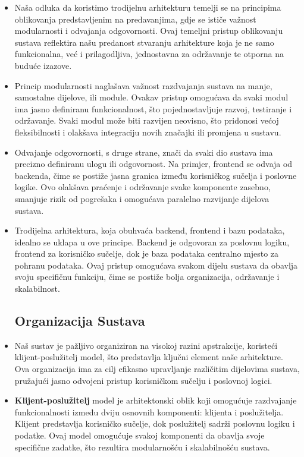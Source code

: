 \begin{itemize}
    \item Naša odluka da koristimo trodijelnu arhitekturu temelji se na principima oblikovanja predstavljenim na predavanjima, gdje se ističe važnost modularnosti i odvajanja odgovornosti. Ovaj temeljni pristup oblikovanju sustava reflektira našu predanost stvaranju arhitekture koja je ne samo funkcionalna, već i prilagodljiva, jednostavna za održavanje te otporna na buduće izazove. 

    \item Princip modularnosti naglašava važnost razdvajanja sustava na manje, samostalne dijelove, ili module. Ovakav pristup omogućava da svaki modul ima jasno definiranu funkcionalnost, što pojednostavljuje razvoj, testiranje i održavanje. Svaki modul može biti razvijen neovisno, što pridonosi većoj fleksibilnosti i olakšava integraciju novih značajki ili promjena u sustavu. 

    \item Odvajanje odgovornosti, s druge strane, znači da svaki dio sustava ima precizno definiranu ulogu ili odgovornost. Na primjer, frontend se odvaja od backenda, čime se postiže jasna granica između korisničkog sučelja i poslovne logike. Ovo olakšava praćenje i održavanje svake komponente zasebno, smanjuje rizik od pogrešaka i omogućava paralelno razvijanje dijelova sustava. 

\item Trodijelna arhitektura, koja obuhvaća backend, frontend i bazu podataka, idealno se uklapa u ove principe. Backend je odgovoran za poslovnu logiku, frontend za korisničko sučelje, dok je baza podataka centralno mjesto za pohranu podataka. Ovaj pristup omogućava svakom dijelu sustava da obavlja svoju specifičnu funkciju, čime se postiže bolja organizacija, održavanje i skalabilnost. 

\subsection*{Organizacija Sustava}
\item Naš sustav je pažljivo organiziran na visokoj razini apstrakcije, koristeći klijent-poslužitelj model, što predstavlja ključni element naše arhitekture. Ova organizacija ima za cilj efikasno upravljanje različitim dijelovima sustava, pružajući jasno odvojeni pristup korisničkom sučelju i poslovnoj logici. 

\item \textbf{Klijent-poslužitelj} model je arhitektonski oblik koji omogućuje razdvajanje funkcionalnosti između dviju osnovnih komponenti: klijenta i poslužitelja. Klijent predstavlja korisničko sučelje, dok poslužitelj sadrži poslovnu logiku i podatke. Ovaj model omogućuje svakoj komponenti da obavlja svoje specifične zadatke, što rezultira modularnošću i skalabilnošću sustava. 


\end{itemize}
